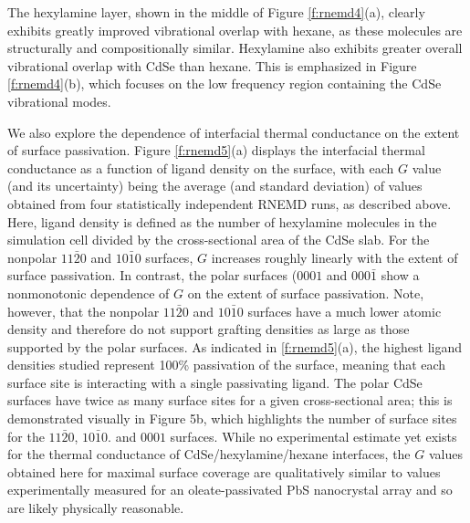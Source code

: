 The hexylamine layer, shown in the middle of Figure \ref{f:rnemd4}(a), clearly exhibits greatly improved vibrational overlap with hexane, as these molecules are structurally and compositionally similar. Hexylamine also exhibits greater overall vibrational overlap with CdSe than hexane. This is emphasized in Figure \ref{f:rnemd4}(b), which focuses on the low frequency region containing the CdSe vibrational modes. \par

We also explore the dependence of interfacial thermal conductance on the extent of surface passivation. Figure \ref{f:rnemd5}(a) displays the interfacial thermal conductance as a function of ligand density on the surface, with each $G$ value (and its uncertainty) being the average (and standard deviation) of values obtained from four statistically independent RNEMD runs, as described above. Here, ligand density is defined as the number of hexylamine molecules in the simulation cell divided by the cross-sectional area of the CdSe slab. For the nonpolar $11\bar{2}0$ and $10\bar{1}0$ surfaces, $G$ increases roughly linearly with the extent of surface passivation. In contrast, the polar surfaces ($0001$ and $000\bar{1}$ show a nonmonotonic dependence of $G$ on the extent of surface passivation. Note, however, that the nonpolar $11\bar{2}0$ and $10\bar{1}0$ surfaces have a much lower atomic density and therefore do not support grafting densities as large as those supported by the polar surfaces. As indicated in \ref{f:rnemd5}(a), the highest ligand densities studied represent 100\% passivation of the surface, meaning that each surface site is interacting with a single passivating ligand. The polar CdSe surfaces have twice as many surface sites for a given cross-sectional area; this is demonstrated visually in Figure 5b, which highlights the number of surface sites for the $11\bar{2}0$, $10\bar{1}0$. and $0001$ surfaces. While no experimental estimate yet exists for the thermal conductance of CdSe/hexylamine/hexane interfaces, the $G$ values obtained here for maximal surface coverage are qualitatively similar to values experimentally measured for an oleate-passivated PbS nanocrystal array\cite{ong2013surface} and so are likely physically reasonable.

